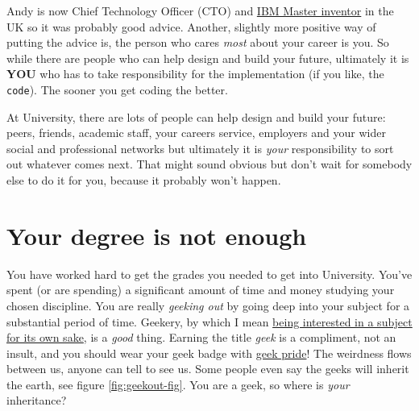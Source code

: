 \documentclass[
]{book}
\begin{document}
Andy is now Chief Technology Officer (CTO) and \href{https://en.wikipedia.org/wiki/IBM_Master_Inventor}{IBM Master inventor} in the UK so it was probably good advice. Another, slightly more positive way of putting the advice is, the person who cares \emph{most} about your career is you. So while there are people who can help design and build your future, ultimately it is \textbf{YOU} who has to take responsibility for the implementation (if you like, the \texttt{code}). The sooner you get coding the better.

At University, there are lots of people can help design and build your future: peers, friends, academic staff, your careers service, employers and your wider social and professional networks but ultimately it is \emph{your} responsibility to sort out whatever comes next. That might sound obvious but don't wait for somebody else to do it for you, because it probably won't happen.

\hypertarget{entitled}{%
\section{Your degree is not enough}\label{entitled}}

You have worked hard to get the grades you needed to get into University. You've spent (or are spending) a significant amount of time and money studying your chosen discipline. You are really \emph{geeking out} by going deep into your subject for a substantial period of time. Geekery, by which I mean \href{https://en.wikipedia.org/wiki/Geek}{being interested in a subject for its own sake}, is a \emph{good} thing. Earning the title \emph{geek} is a compliment, not an insult, and you should wear your geek badge with \href{https://en.wikipedia.org/wiki/Geek_Pride_Day}{geek pride}! The weirdness flows between us, anyone can tell to see us. \citep{freakscene} Some people even say the geeks will inherit the earth, see figure \ref{fig:geekout-fig}. You are a geek, so where is \emph{your} inheritance?
\end{document}
